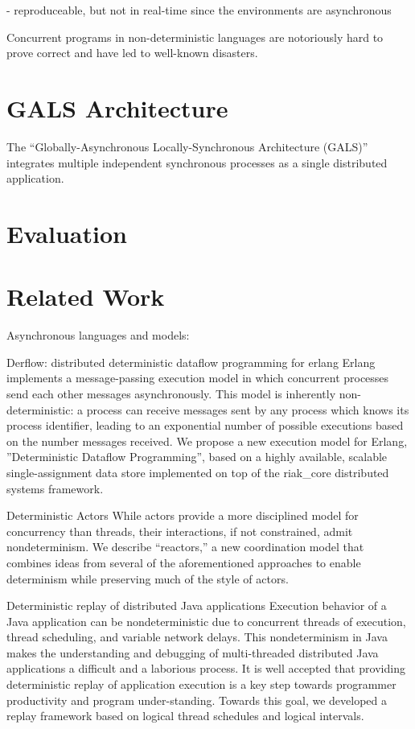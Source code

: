 \documentclass[sigplan,screen]{acmart}
\begin{document}
- reproduceable, but not in real-time since the environments are asynchronous

Concurrent programs in non-deterministic languages are notoriously hard to prove correct and have led to well-known disasters.

\section{GALS Architecture}
\label{sec.gals}

The ``Globally-Asynchronous Locally-Synchronous Architecture (GALS)''
integrates multiple independent synchronous processes as a single distributed
application.

\section{Evaluation}

\section{Related Work}

Asynchronous languages and models:

Derflow: distributed deterministic dataflow programming for erlang
Erlang implements a message-passing execution model in which concurrent processes send each other messages asynchronously. This model is inherently non-deterministic: a process can receive messages sent by any process which knows its process identifier, leading to an exponential number of possible executions based on the number messages received. 
We propose a new execution model for Erlang, ''Deterministic Dataflow Programming'', based on a highly available, scalable single-assignment data store implemented on top of the riak\_core distributed systems framework.

Deterministic Actors
While actors provide a more disciplined model for concurrency than threads, their interactions, if not constrained, admit nondeterminism.
 We describe “reactors,” a new coordination model that combines ideas from several of the aforementioned approaches to enable determinism while preserving much of the style of actors.

Deterministic replay of distributed Java applications
Execution behavior of a Java application can be nondeterministic due to concurrent threads of execution, thread scheduling, and variable network delays. This nondeterminism in Java makes the understanding and debugging of multi-threaded distributed Java applications a difficult and a laborious process.
It is well accepted that providing deterministic replay of application execution is a key step towards programmer productivity and program under-standing.
Towards this goal, we developed a replay framework based on logical thread schedules and logical intervals.
\end{document}
